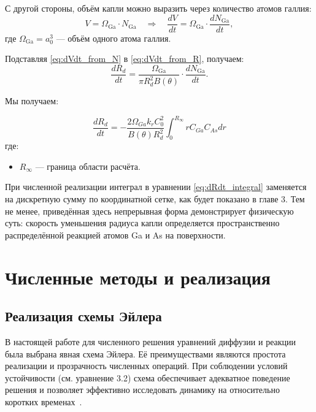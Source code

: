 \documentclass[14pt,oneside]{extarticle}
\begin{document}
С другой стороны, объём капли можно выразить через количество атомов галлия:
\begin{equation}
V = \Omega_{\text{Ga}} \cdot N_{\text{Ga}} \quad \Rightarrow \quad \frac{dV}{dt} = \Omega_{\text{Ga}} \cdot \frac{dN_{\text{Ga}}}{dt},
\label{eq:dVdt_from_N}
\end{equation}
где $\Omega_{\text{Ga}} = a_0^3$ — объём одного атома галлия.

Подставляя \eqref{eq:dVdt_from_N} в \eqref{eq:dVdt_from_R}, получаем:
\begin{equation}
\frac{dR_d}{dt} = \frac{\Omega_{\text{Ga}} }{\pi R_d^2 B(\theta)} \cdot \frac{dN_{\text{Ga}}}{dt}.
\end{equation}

Мы получаем:

\begin{equation}
\frac{dR_{d}}{dt}=-\frac{2\Omega_{Ga}k_{r}C_{0}^{2}}{B\left(\theta\right)R_{d}^{2}}\int_{0}^{R_{\infty}}rC_{Ga}C_{As}dr
\label{eq:dRdt_integral}
\end{equation}
где:
\begin{itemize}
  \item \( R_\infty \) — граница области расчёта.
\end{itemize}

При численной реализации интеграл в уравнении \eqref{eq:dRdt_integral} заменяется на дискретную сумму по координатной сетке, как будет показано в главе 3. Тем не менее, приведённая здесь непрерывная форма демонстрирует физическую суть: скорость уменьшения радиуса капли определяется пространственно распределённой реакцией атомов Ga и As на поверхности.


\pagebreak
\section{Численные методы и реализация}

\subsection{Реализация схемы Эйлера}

В настоящей работе для численного решения уравнений диффузии и реакции была выбрана явная схема Эйлера. Её преимуществами являются простота реализации и прозрачность численных операций. При соблюдении условий устойчивости (см. уравнение 3.2) схема обеспечивает адекватное поведение решения и позволяет эффективно исследовать динамику на относительно коротких временах~\cite{usheva2014}.
\end{document}
